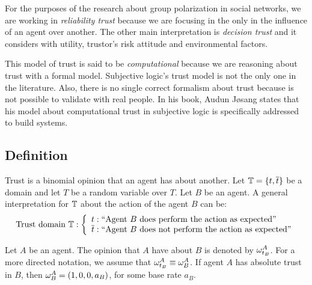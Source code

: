 \documentclass[a4paper,12pt]{article}
\theoremstyle{definition}
\numberwithin{equation}{section}
\newcommand{\qm}[1]{`#1'}
\begin{document}
For the purposes of the research about group polarization in social networks, we are working in \emph{reliability trust} because we are focusing in the only in the influence of an agent over another. The other main interpretation is \emph{decision trust} and it considers with utility, trustor's risk attitude and environmental factors.

This model of trust is said to be \emph{computational} because we are reasoning about trust with a formal model. Subjective logic's trust model is not the only one in the literature. Also, there is no single correct formalism about trust because is not possible to validate with real people. In his book, Audun Jøsang states that his model about computational trust in subjective logic is specifically addressed to build systems.

\subsection{Definition}

Trust is a binomial opinion that an agent has about another. Let $\mathbb{T} = \{t, \overline{t}\}$ be a domain and let $T$ be a random variable over $T$. Let $B$ be an agent. A general interpretation for $\mathbb{T}$ about the action of the agent $B$ can be:
\begin{equation}
	\text{Trust domain } \dom{T}: \left\{
	\begin{array}{l}
	t: \text{\qm{\qm{Agent $B$ does perform the action as expected}}}\\
	\overline{t}: \text{\qm{\qm{Agent $B$ does not perform the action as expected}}}
	\end{array}
	\right.
\end{equation}

Let $A$ be an agent. The opinion that $A$ have about $B$ is denoted by $\omega^{A}_{t_B}$. For a more directed notation, we assume that $\omega^{A}_{t_B} \equiv \omega^{A}_{B}$. If agent $A$ has absolute trust in $B$, then $\omega^{A}_{B} = (1, 0, 0, a_B)$, for some base rate $a_B$.

%
%	
%	
\end{document}
